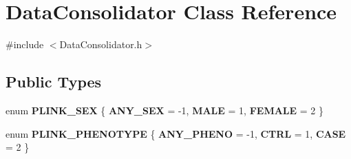 \hypertarget{classDataConsolidator}{\section{Data\-Consolidator Class Reference}
\label{classDataConsolidator}
}


{\ttfamily \#include $<$Data\-Consolidator.\-h$>$}

\subsection*{Public Types}
\begin{DoxyCompactItemize}
\item 
enum {\bfseries P\-L\-I\-N\-K\-\_\-\-S\-E\-X} \{ {\bfseries A\-N\-Y\-\_\-\-S\-E\-X} =  -\/1, 
{\bfseries M\-A\-L\-E} =  1, 
{\bfseries F\-E\-M\-A\-L\-E} =  2
 \}
\item 
enum {\bfseries P\-L\-I\-N\-K\-\_\-\-P\-H\-E\-N\-O\-T\-Y\-P\-E} \{ {\bfseries A\-N\-Y\-\_\-\-P\-H\-E\-N\-O} =  -\/1, 
{\bfseries C\-T\-R\-L} =  1, 
{\bfseries C\-A\-S\-E} =  2
 \}
\end{DoxyCompactItemize}
